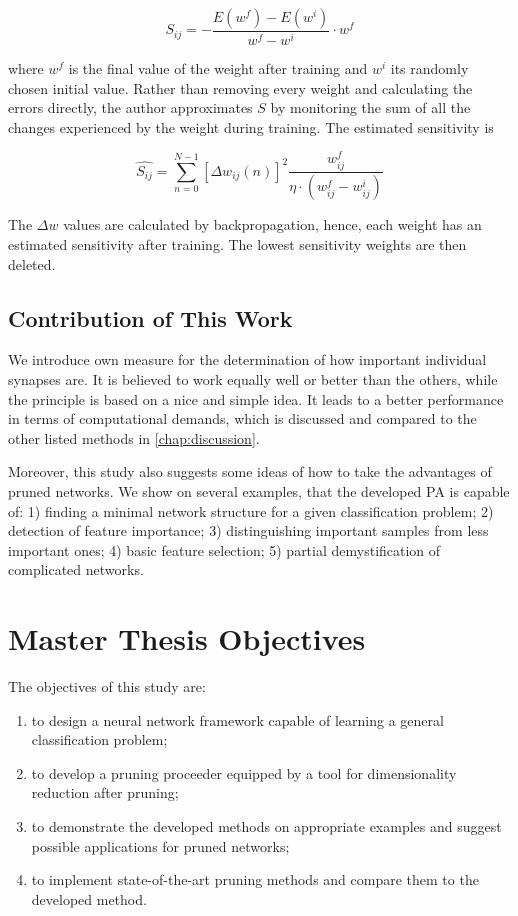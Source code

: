 \begin{equation}
S_{ij} = - \frac{E(w^f) - E(w^i)}{w^f - w^i} \cdot w^f
\end{equation}

where $ w^f $ is the final value of the weight after training and $ w^i $ its randomly chosen initial value. Rather than removing every weight and calculating the errors directly, the author approximates $ S $ by monitoring the sum of all the changes experienced by the weight during training. The estimated sensitivity is

\begin{equation}
\hat{S_{ij}} = \displaystyle{\sum_{n=0}^{N-1} \left[\Delta w_{ij} (n)\right]^2 \frac{w_{ij}^f}{\eta \cdot (w_{ij}^f - w_{ij}^i)}}
\end{equation}

The $ \Delta w $ values are calculated by backpropagation, hence, each weight has an estimated sensitivity after training. The lowest sensitivity weights are then deleted.

\subsection*{Contribution of This Work} \label{ssec:contribution_of_this_work}
We introduce own measure for the determination of how important individual synapses are. It is believed to work equally well or better than the others, while the principle is based on a nice and simple idea. It leads to a better performance in terms of computational demands, which is discussed and compared to the other listed methods in \cref{chap:discussion}.

Moreover, this study also suggests some ideas of how to take the advantages of pruned networks. We show on several examples, that the developed PA is capable of: 1) finding a minimal network structure for a given classification problem; 2) detection of feature importance; 3) distinguishing important samples from less important ones; 4) basic feature selection; 5) partial demystification of complicated networks.

\section{Master Thesis Objectives} \label{sec:thesis_objectives}
The objectives of this study are:

\begin{enumerate}
\item to design a neural network framework capable of learning a general classification problem;
\item to develop a pruning proceeder equipped by a tool for dimensionality reduction after pruning;
\item to demonstrate the developed methods on appropriate examples and suggest possible applications for pruned networks;
\item to implement state-of-the-art pruning methods and compare them to the developed method.
\end{enumerate}

